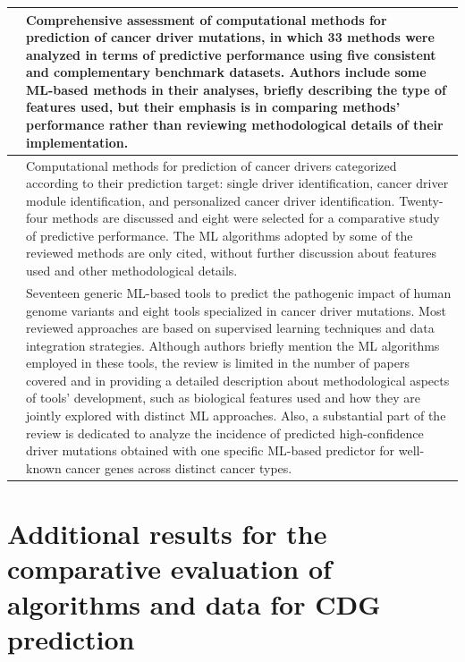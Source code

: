 \documentclass[ppgc, diss, english]{iiufrgs}
\begin{document}
\begin{table}[]
{\begin{tabular}{L{3.5cm}L{16cm}}
\citet{chen2020comprehensive} & Comprehensive assessment of computational methods for prediction of cancer driver mutations, in which 33 methods were analyzed in terms of predictive performance using five consistent and complementary benchmark datasets. Authors include some ML-based methods in their analyses, briefly describing the type of features used, but their emphasis is in comparing methods' performance rather than reviewing methodological details of their implementation. \\\hline
\citet{pham2021computational} & Computational methods for prediction of cancer drivers categorized according to their prediction target: single driver identification, cancer driver module identification, and personalized cancer driver identification. Twenty-four methods are discussed and eight were selected for a comparative study of predictive performance. The ML algorithms adopted by some of the reviewed methods are only cited, without further discussion about features used and other methodological details. \\\hline
\citet{Rogers+2021} & Seventeen generic ML-based tools to predict the pathogenic impact of human genome variants and eight tools specialized in cancer driver mutations. Most reviewed approaches are based on supervised learning techniques and data integration strategies. Although authors briefly mention the ML algorithms employed in these tools, the review is limited in the number of papers covered and in providing a detailed description about methodological aspects of tools' development, such as biological features used and how they are jointly explored with distinct ML approaches. Also, a substantial part of the review is dedicated to analyze the incidence of predicted high-confidence driver mutations obtained with one specific ML-based predictor for well-known cancer genes across distinct cancer types.\\
\hline
\end{tabular}%
}
\end{table}











\chapter{Additional results for the comparative evaluation of algorithms and data for CDG prediction}
\label{sec:appendix_cap5}
\end{document}
